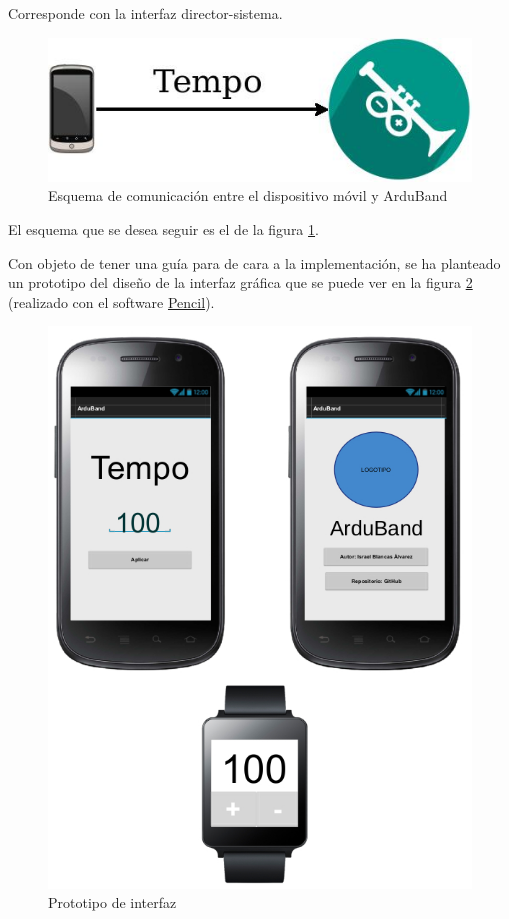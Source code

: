 Corresponde con la interfaz director-sistema.\\

\begin{figure}[htb]
\centering
\includegraphics[width=1\textwidth]{./imagenes/movilarduband}
\caption{Esquema de comunicación entre el dispositivo móvil y ArduBand} \label{fig:movilarduband}
\end{figure}

El esquema que se desea seguir es el de la figura \ref{fig:movilarduband}.

Con objeto de tener una guía para de cara a la implementación, se ha planteado un
prototipo del diseño de la interfaz gráfica que se puede ver en la figura
\ref{fig:prototipointerfaz} (realizado con el software \href{http://pencil.evolus.vn/}{Pencil}).\\

\begin{figure}[htb]
\centering
\includegraphics[width=1\textwidth]{./imagenes/prototipointerfaz}
\caption{Prototipo de interfaz} \label{fig:prototipointerfaz}
\end{figure}


